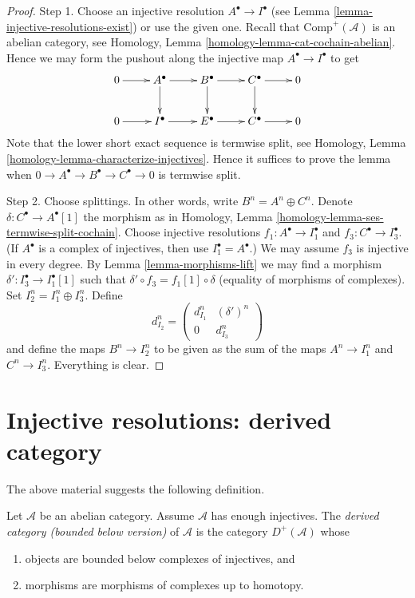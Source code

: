 \begin{proof}
Step 1. Choose an injective resolution $A^\bullet \to I^\bullet$ (see
Lemma \ref{lemma-injective-resolutions-exist}) or use the given one.
Recall that $\text{Comp}^{+}(\mathcal{A})$ is an
abelian category, see
Homology, Lemma \ref{homology-lemma-cat-cochain-abelian}.
Hence we may form the pushout along
the injective map $A^\bullet \to I^\bullet$ to get
$$
\xymatrix{
0 \ar[r] &
A^\bullet \ar[r] \ar[d] &
B^\bullet \ar[r] \ar[d] &
C^\bullet \ar[r] \ar[d] &
0 \\
0 \ar[r] &
I^\bullet \ar[r] &
E^\bullet \ar[r] &
C^\bullet \ar[r] &
0
}
$$
Note that the lower short exact sequence is termwise split, see
Homology, Lemma \ref{homology-lemma-characterize-injectives}.
Hence it suffices to prove the lemma when
$0 \to A^\bullet \to B^\bullet \to C^\bullet \to 0$ is
termwise split.

\medskip\noindent
Step 2. Choose splittings. In other words, write
$B^n = A^n \oplus C^n$. Denote $\delta : C^\bullet \to A^\bullet[1]$
the morphism as in
Homology, Lemma \ref{homology-lemma-ses-termwise-split-cochain}.
Choose injective resolutions $f_1 : A^\bullet \to I_1^\bullet$
and $f_3 : C^\bullet \to I_3^\bullet$. (If $A^\bullet$ is a complex of
injectives, then use $I_1^\bullet = A^\bullet$.)
We may assume $f_3$ is injective in
every degree. By Lemma \ref{lemma-morphisms-lift} we may find
a morphism $\delta' : I_3^\bullet \to I_1^\bullet[1]$ such
that $\delta' \circ f_3 = f_1[1] \circ \delta$ (equality of
morphisms of complexes). Set $I_2^n = I_1^n \oplus I_3^n$.
Define
$$
d_{I_2}^n =
\left(
\begin{matrix}
d_{I_1}^n & (\delta')^n \\
0 & d_{I_3}^n
\end{matrix}
\right)
$$
and define the maps $B^n \to I_2^n$ to be given as the
sum of the maps $A^n \to I_1^n$ and $C^n \to I_3^n$.
Everything is clear.
\end{proof}




\section{Injective resolutions: derived category}
\label{section-derived-category}

\noindent
The above material suggests the following definition.

\begin{definition}
\label{definition-derived-category}
Let $\mathcal{A}$ be an abelian category.
Assume $\mathcal{A}$ has enough injectives.
The {\it derived category (bounded below version)} of $\mathcal{A}$
is the category $D^{+}(\mathcal{A})$ whose
\begin{enumerate}
\item objects are bounded below complexes of injectives, and
\item morphisms are morphisms of complexes up to homotopy.
\end{enumerate}
\end{definition}

